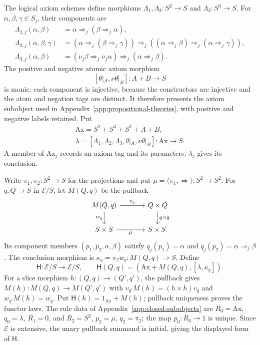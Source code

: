 The logical axiom schemes define morphisms
$\Lambda_1,\Lambda_3:S^2\to S$ and $\Lambda_2:S^3\to S$.
For $\alpha,\beta,\gamma\in S_j$, their components are
\begin{align*}
 \Lambda_{1,j}(\alpha,\beta)
   &=\alpha\Rightarrow_j(\beta\Rightarrow_j\alpha),\\
 \Lambda_{2,j}(\alpha,\beta,\gamma)
   &=(\alpha\Rightarrow_j(\beta\Rightarrow_j\gamma))
     \Rightarrow_j((\alpha\Rightarrow_j\beta)
                         \Rightarrow_j(\alpha\Rightarrow_j\gamma)),\\
 \Lambda_{3,j}(\alpha,\beta)
   &=(\nu_j\beta\Rightarrow_j\nu_j\alpha)
                         \Rightarrow_j(\alpha\Rightarrow_j\beta).
\end{align*}
The positive and negative atomic axiom morphism
\[
 [\theta|_A,\nu\theta|_B]:A+B\longrightarrow S
\]
is monic: each component is injective, because the constructors are
injective and the atom and negation tags are distinct. It therefore
presents the axiom subobject used in
Appendix~\ref{app:propositional-theories}, with positive and negative
labels retained. Put
\[
 \begin{gathered}
 \mathrm{Ax}=S^2+S^3+S^2+A+B,\\
 \lambda=[\Lambda_1,\Lambda_2,\Lambda_3,\theta|_A,\nu\theta|_B]:
                 \mathrm{Ax}\longrightarrow S.
 \end{gathered}
\]
A member of $\mathrm{Ax}_j$ records an axiom tag and its parameters;
$\lambda_j$ gives its conclusion.

Write $\pi_1,\pi_2:S^2\to S$ for the projections and put
$\mu=\langle\pi_1,\Rightarrow\rangle:S^2\to S^2$.
For $q:Q\to S$ in $\mathcal E/S$, let $M(Q,q)$ be the pullback
\[
\begin{tikzcd}[column sep=large]
 M(Q,q)\arrow[r,"v_q"]\arrow[d,"w_q"'] &
 Q\times Q\arrow[d,"q\times q"]\\
 S\times S\arrow[r,"\mu"'] & S\times S.
\end{tikzcd}
\]
Its component members $(p_1,p_2,\alpha,\beta)$ satisfy
$q_j(p_1)=\alpha$ and $q_j(p_2)=\alpha\Rightarrow_j\beta$.
The conclusion morphism is
$\kappa_q=\pi_2w_q:M(Q,q)\to S$. Define
\[
 \mathsf H:\mathcal E/S\longrightarrow\mathcal E/S,
 \qquad
 \mathsf H(Q,q)=
       (\mathrm{Ax}+M(Q,q),[\lambda,\kappa_q]).
\]
For a slice morphism $h:(Q,q)\to(Q',q')$, the pullback gives
$M(h):M(Q,q)\to M(Q',q')$ with
$v_{q'}M(h)=(h\times h)v_q$ and $w_{q'}M(h)=w_q$.
Put $\mathsf H(h)=1_{\mathrm{Ax}}+M(h)$; pullback uniqueness
proves the functor laws. The rule data of
Appendix~\ref{app:closed-subobjects} are
$R_0=\mathrm{Ax}$, $q_0=\lambda$, $R_1=0$, and
$R_2=S^2$, $p_2=\mu$, $q_2=\pi_2$; the map $p_0:R_0\to1$
is unique. Since $\mathcal E$ is extensive, the unary pullback
summand is initial, giving the displayed form of $\mathsf H$.

